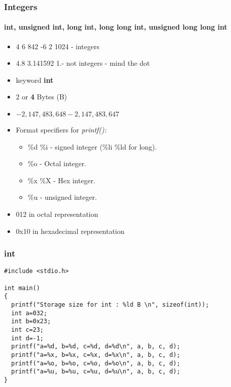 \documentclass[10pt]{beamer}
\begin{document}
\begin{frame}
  \frametitle{Integers}
  \framesubtitle{int, unsigned int, long int, long long int, unsigned long long int}
  \centering

    \begin{itemize}
      \item 4 6 842 -6 2 1024 - integers\\
      \item 4.8 3.141592 1.- not integers - mind the dot
      \item keyword {\bf int}
      \item 2 or {\bf 4} Bytes (B)
      \item $-2,147,483,648 - 2,147,483,647$
      \item Format specifiers for \it printf():
        \begin{itemize}
          \item \%d \%i - signed integer (\%li \%ld for long).
          \item \%o	- Octal integer.
          \item \%x \%X - Hex integer.
          \item \%u - unsigned integer.
        \end{itemize}
      \item 012 in octal representation
      \item 0x10 in hexadecimal representation
    \end{itemize}

\end{frame}

\begin{frame}[fragile]
  \frametitle{int}
  \centering

    \begin{lstlisting}
#include <stdio.h>

int main()
{
  printf("Storage size for int : %ld B \n", sizeof(int));
  int a=032;
  int b=0x23;
  int c=23;
  int d=-1;
  printf("a=%d, b=%d, c=%d, d=%d\n", a, b, c, d);
  printf("a=%x, b=%x, c=%x, d=%x\n", a, b, c, d);
  printf("a=%o, b=%o, c=%o, d=%o\n", a, b, c, d);
  printf("a=%u, b=%u, c=%u, d=%u\n", a, b, c, d);
}
    \end{lstlisting}
\end{frame}
\end{document}
